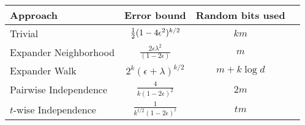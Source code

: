 \renewcommand{\arraystretch}{2}
\begin{center}
\begin{tabular}{|l|c|c|c|}
\hline 
Approach & Error bound & Random bits used  \\ 
\hline 
Trivial & $\frac{1}{2}(1-4\epsilon^2)^{k/2}$ & $km$ \\ 
\hline 
Expander Neighborhood & $\frac{\displaystyle 2\epsilon\lambda^2}{\displaystyle (1-2\epsilon)}$ & $m$ \\ 
\hline 
Expander Walk & $2^k(\epsilon+\lambda)^{k/2}$ & $m+k\log d$ \\ 
\hline 
Pairwise Independence & $\frac{\displaystyle 4}{\displaystyle k(1-2\epsilon)^2}$ & $2m$ \\ 
\hline
$t$-wise Independence & $\frac{\displaystyle 1}{\displaystyle k^{t/2}(1-2\epsilon)^t}$ & $tm$ \\ 
\hline
\end{tabular} 
\end{center}
\renewcommand{\arraystretch}{1}
